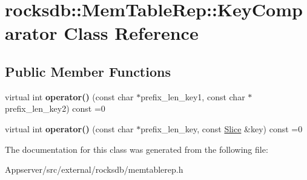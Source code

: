 \hypertarget{classrocksdb_1_1MemTableRep_1_1KeyComparator}{}\section{rocksdb\+:\+:Mem\+Table\+Rep\+:\+:Key\+Comparator Class Reference}
\label{classrocksdb_1_1MemTableRep_1_1KeyComparator}
\subsection*{Public Member Functions}
\begin{DoxyCompactItemize}
\item 
virtual int {\bfseries operator()} (const char $\ast$prefix\+\_\+len\+\_\+key1, const char $\ast$prefix\+\_\+len\+\_\+key2) const =0\hypertarget{classrocksdb_1_1MemTableRep_1_1KeyComparator_a7d9ddc98e3bc44efbb77197428f5ae5a}{}\label{classrocksdb_1_1MemTableRep_1_1KeyComparator_a7d9ddc98e3bc44efbb77197428f5ae5a}

\item 
virtual int {\bfseries operator()} (const char $\ast$prefix\+\_\+len\+\_\+key, const \hyperlink{classrocksdb_1_1Slice}{Slice} \&key) const =0\hypertarget{classrocksdb_1_1MemTableRep_1_1KeyComparator_ab17adac38a1b69c57832801223a4efa2}{}\label{classrocksdb_1_1MemTableRep_1_1KeyComparator_ab17adac38a1b69c57832801223a4efa2}

\end{DoxyCompactItemize}


The documentation for this class was generated from the following file\+:\begin{DoxyCompactItemize}
\item 
Appserver/src/external/rocksdb/memtablerep.\+h\end{DoxyCompactItemize}
